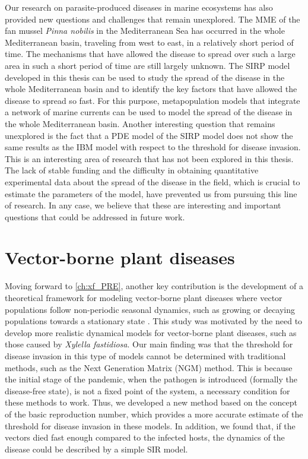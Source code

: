 Our research on parasite-produced diseases in marine ecosystems has also
provided new questions and challenges that remain unexplored. The MME of the
fan mussel \textit{Pinna nobilis} in the Mediterranean Sea has occurred
in the whole Mediterranean basin, traveling from west to east, in a relatively
short period of time. The mechanisms that have allowed the disease to spread
over such a large area in such a short period of time are still largely
unknown. The SIRP model developed in this thesis can be used to study the
spread of the disease in the whole Mediterranean basin and to identify the key
factors that have allowed the disease to spread so fast. For this purpose,
metapopulation models that integrate a network of marine currents can be used
to model the spread of the disease in the whole Mediterranean basin. Another
interesting question that remains unexplored is the fact that a PDE model of
the SIRP model does not show the same results as the IBM model with respect to
the threshold for disease invasion. This is an interesting area of research
that has not been explored in this thesis. The lack of stable funding and
the difficulty in obtaining quantitative experimental data about the spread
of the disease in the field, which is crucial to estimate the parameters of the
model, have prevented us from pursuing this line of research. In any case, we
believe that these are interesting and important questions that could be
addressed in future work.

\section{Vector-borne plant diseases}

Moving forward to \cref{ch:xf_PRE}, another key contribution is the
development of a theoretical framework for modeling vector-borne plant diseases
where vector populations follow non-periodic seasonal dynamics, such as growing
or decaying populations towards a stationary state
\cite{GimenezRomero2022_PRE}. This study was motivated by the need to develop
more realistic dynamical models for vector-borne plant diseases, such as those
caused by \textit{Xylella fastidiosa}. Our main finding was that the threshold
for disease invasion in this type of models cannot be determined with
traditional methods, such as the Next Generation Matrix (NGM) method. This is
because the initial stage of the pandemic, when the pathogen is introduced
(formally the disease-free state), is not a fixed point of the system, a
necessary condition for these methods to work. Thus, we developed a
new method based on the concept of the basic reproduction number, which
provides a more accurate estimate of the threshold for disease invasion in
these models. In addition, we found that, if the vectors died fast enough
compared to the infected hosts, the dynamics of the disease could be described
by a simple SIR model.

